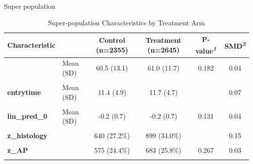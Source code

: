 \documentclass[
  ignorenonframetext,
  aspectratio=169]{beamer}
\begin{document}
\begin{frame}{Super population}
\label{super-population}
\small

\begin{table}[t]
\caption*{
{\fontsize{10}{13}\selectfont  Super-population Characteristics by Treatment Arm\fontsize{9}{11}\selectfont }
} 
\fontsize{9.0pt}{11.0pt}\selectfont
\begin{tabular*}{0.8\linewidth}{@{\extracolsep{\fill}}llcccc}
\toprule
{Characteristic} & {} & {Control
(n=2355)} & {Treatment
(n=2645)} & {P-value}\textsuperscript{\textit{1}} & {SMD}\textsuperscript{\textit{2}} \\ 
\midrule\addlinespace[2.5pt]
{\bfseries z\_age} & Mean (SD) & 60.5 (13.1) & 61.0 (11.7) & 0.182 & 0.04 \\ 
{\bfseries \cellcolor[HTML]{F9F9F9}{z\_bm}} & {\cellcolor[HTML]{F9F9F9}{Mean (SD)}} & {\cellcolor[HTML]{F9F9F9}{7.0 (6.4)}} & {\cellcolor[HTML]{F9F9F9}{8.7 (7.3)}} & {\cellcolor[HTML]{FFF3CD}{<0.001}} & {\cellcolor[HTML]{FFF3CD}{0.25}} \\ 
{\bfseries entrytime} & Mean (SD) & 11.4 (4.9) & 11.7 (4.7) & {\cellcolor[HTML]{FFF3CD}{0.022}} & 0.07 \\ 
{\bfseries \cellcolor[HTML]{F9F9F9}{lin\_pred\_1}} & {\cellcolor[HTML]{F9F9F9}{Mean (SD)}} & {\cellcolor[HTML]{F9F9F9}{-0.1 (1.3)}} & {\cellcolor[HTML]{F9F9F9}{0.2 (1.5)}} & {\cellcolor[HTML]{FFF3CD}{<0.001}} & {\cellcolor[HTML]{FFF3CD}{0.23}} \\ 
{\bfseries lin\_pred\_0} & Mean (SD) & -0.2 (0.7) & -0.2 (0.7) & 0.131 & 0.04 \\ 
{\bfseries \cellcolor[HTML]{F9F9F9}{z\_male}} & {\cellcolor[HTML]{F9F9F9}{}} & {\cellcolor[HTML]{F9F9F9}{1674 (71.1\%)}} & {\cellcolor[HTML]{F9F9F9}{2003 (75.7\%)}} & {\cellcolor[HTML]{FFF3CD}{<0.001}} & {\cellcolor[HTML]{F9F9F9}{0.11}} \\ 
{\bfseries z\_histology} &  & 640 (27.2\%) & 899 (34.0\%) & {\cellcolor[HTML]{FFF3CD}{<0.001}} & 0.15 \\ 
{\bfseries \cellcolor[HTML]{F9F9F9}{z\_prior\_treat}} & {\cellcolor[HTML]{F9F9F9}{}} & {\cellcolor[HTML]{F9F9F9}{1690 (71.8\%)}} & {\cellcolor[HTML]{F9F9F9}{1904 (72.0\%)}} & {\cellcolor[HTML]{F9F9F9}{0.886}} & {\cellcolor[HTML]{F9F9F9}{0.00}} \\ 
{\bfseries z\_AP} &  & 575 (24.4\%) & 683 (25.8\%) & 0.267 & 0.03 \\ 
{\bfseries \cellcolor[HTML]{F9F9F9}{ecog}} & {\cellcolor[HTML]{F9F9F9}{}} & {\cellcolor[HTML]{F9F9F9}{1257 (53.4\%)}} & {\cellcolor[HTML]{F9F9F9}{1375 (52.0\%)}} & {\cellcolor[HTML]{F9F9F9}{0.340}} & {\cellcolor[HTML]{F9F9F9}{0.03}} \\ 

\end{tabular*}
\end{table}
\end{frame}
\end{document}
